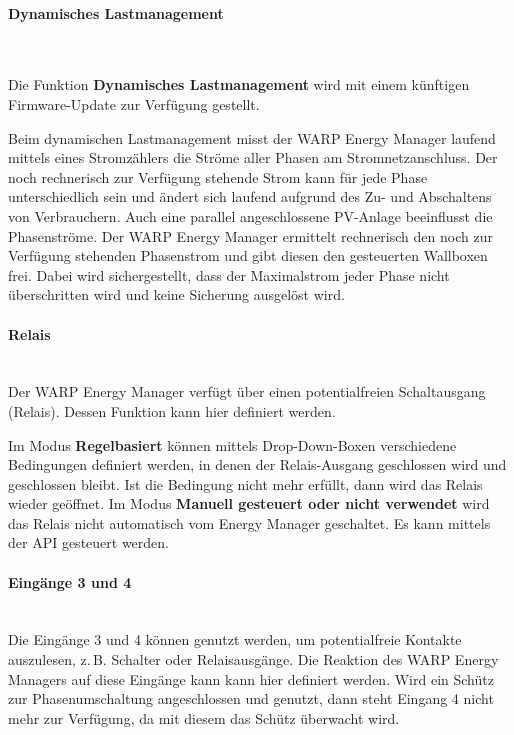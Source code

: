 \documentclass[a4paper,10pt]{article}
\newcommand{\hint}[1]{\begin{tcolorbox}[colback=boxgray,colframe=black,coltext=
white,title=Hinweis,left*=2mm,right*=2mm,boxsep=1mm,bottom=1mm,top=1mm]#1\end{tcolorbox}}
\begin{document}
\begin{multicols*}{2}
	\paragraph{Dynamisches Lastmanagement}\ \\
	\hint{Die Funktion \textbf{Dynamisches Lastmanagement} wird mit einem künftigen Firmware-Update zur Verfügung gestellt.}

	Beim dynamischen Lastmanagement misst der WARP Energy Manager laufend mittels eines Stromzählers die
	Ströme aller Phasen am Stromnetzanschluss. Der noch rechnerisch zur
	Verfügung stehende Strom kann für jede Phase unterschiedlich sein und ändert
	sich laufend aufgrund des Zu- und Abschaltens von Verbrauchern. Auch eine
	parallel angeschlossene PV-Anlage beeinflusst die Phasenströme. Der WARP
	Energy Manager ermittelt rechnerisch den noch zur Verfügung stehenden
	Phasenstrom und gibt diesen den gesteuerten Wallboxen frei.
	Dabei wird sichergestellt, dass der Maximalstrom jeder Phase nicht überschritten wird und keine Sicherung ausgelöst wird.

	\paragraph{Relais}\ \\
	Der WARP Energy Manager verfügt über einen potentialfreien Schaltausgang
	(Relais). Dessen Funktion kann hier definiert werden.

	Im Modus
	\textbf{Regelbasiert} können mittels Drop-Down-Boxen verschiedene Bedingungen definiert werden, in
	denen der Relais-Ausgang geschlossen wird und geschlossen bleibt. Ist die
	Bedingung nicht mehr erfüllt, dann wird das Relais wieder geöffnet.
	Im Modus \textbf{Manuell gesteuert oder nicht verwendet} wird das Relais nicht automatisch vom Energy Manager geschaltet. Es kann mittels der API gesteuert werden.

	\paragraph{Eingänge 3 und 4}\ \\
	Die Eingänge 3 und 4 können genutzt werden, um potentialfreie Kontakte auszulesen,
	z.\,B. Schalter oder Relaisausgänge. Die Reaktion des WARP Energy Managers auf diese Eingänge
	kann kann hier definiert werden. Wird ein Schütz zur
	Phasenumschaltung angeschlossen und genutzt, dann steht Eingang 4 nicht mehr
	zur Verfügung, da mit diesem das Schütz überwacht wird.


\end{multicols*}
\end{document}
